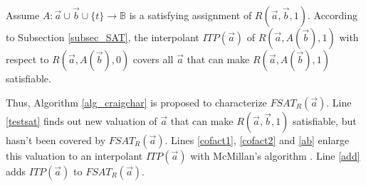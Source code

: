 \documentclass[runningheads,a4paper,orivec]{llncs}
\begin{document}





Assume $A:\vec{a}\cup\vec{b}\cup\{t\}\to \mathbb{B}$ is a satisfying assignment of $R(\vec{a},\vec{b},1)$.
According to Subsection \ref{subsec_SAT},
the interpolant $ITP(\vec{a})$ of $R(\vec{a},A(\vec{b}),1)$ with respect to $R(\vec{a},A(\vec{b}),0)$ 
covers all $\vec{a}$ that can make $R(\vec{a},A(\vec{b}),1)$ satisfiable.


Thus,
Algorithm \ref{alg_craigchar} is proposed to characterize $FSAT_R(\vec{a})$.
Line \ref{testsat} finds out new valuation of $\vec{a}$ that can make $R(\vec{a},\vec{b},1)$ satisfiable,
but hasn't been covered by $FSAT_R(\vec{a})$.
Lines \ref{cofact1}, \ref{cofact2} and \ref{ab} enlarge this valuation 
to an interpolant $ITP(\vec{a})$ with McMillan's algorithm \cite{interp_McMillan}.
Line \ref{add} adds $ITP(\vec{a})$ to $FSAT_R(\vec{a})$.
% 
\end{document}
